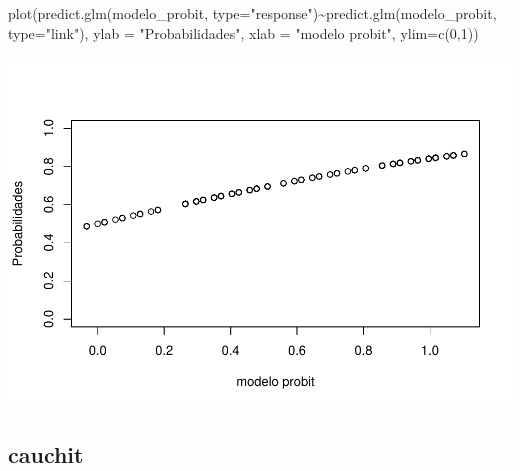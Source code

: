 \documentclass[
]{article}
\newenvironment{Shaded}{\begin{snugshade}}{\end{snugshade}}
\newcommand{\AttributeTok}[1]{\textcolor[rgb]{0.77,0.63,0.00}{#1}}
\newcommand{\DecValTok}[1]{\textcolor[rgb]{0.00,0.00,0.81}{#1}}
\newcommand{\FunctionTok}[1]{\textcolor[rgb]{0.00,0.00,0.00}{#1}}
\newcommand{\NormalTok}[1]{#1}
\newcommand{\OtherTok}[1]{\textcolor[rgb]{0.56,0.35,0.01}{#1}}
\newcommand{\SpecialCharTok}[1]{\textcolor[rgb]{0.00,0.00,0.00}{#1}}
\newcommand{\StringTok}[1]{\textcolor[rgb]{0.31,0.60,0.02}{#1}}
\begin{document}
\begin{Shaded}
\begin{Highlighting}[]
\FunctionTok{plot}\NormalTok{(}\FunctionTok{predict.glm}\NormalTok{(modelo\_probit, }\AttributeTok{type=}\StringTok{"response"}\NormalTok{)}\SpecialCharTok{\textasciitilde{}}\FunctionTok{predict.glm}\NormalTok{(modelo\_probit, }\AttributeTok{type=}\StringTok{"link"}\NormalTok{),}
     \AttributeTok{ylab =} \StringTok{"Probabilidades"}\NormalTok{,}
     \AttributeTok{xlab =} \StringTok{"modelo probit"}\NormalTok{,}
     \AttributeTok{ylim=}\FunctionTok{c}\NormalTok{(}\DecValTok{0}\NormalTok{,}\DecValTok{1}\NormalTok{))}
\end{Highlighting}
\end{Shaded}

\includegraphics{EDA__files/figure-latex/unnamed-chunk-11-2.pdf}

\hypertarget{cauchit}{%
\subsection{cauchit}\label{cauchit}}

\begin{Shaded}
\end{Shaded}
\end{document}
